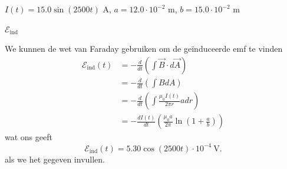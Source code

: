     \begin{description}[labelwidth=1.5cm, leftmargin=!]
        \item[Geg. :] $I(t) = 15.0\sin(2500t)$ A, $a = 12.0 \cdot 10^{-2}$ m, $b = 15.0 \cdot 10^{-2}$ m
        \item[Gevr. :] $\mathcal{E}_{\text{ind}}$
        \item[Opl. :]
            We kunnen de wet van Faraday gebruiken om de geïnduceerde emf te vinden
            \begin{align*}
                \mathcal{E}_{\text{ind}}(t) 
                    &= - \frac{d}{dt} \left( \int \vec{B} \cdot d\vec{A} \right) \\
                    &= - \frac{d}{dt} \left( \int B dA \right) \\
                    &= - \frac{d}{dt} \left( \int \frac{\mu_0 I(t)}{2\pi r}adr \right) \\
                    &= - \frac{dI(t)}{dt} \left( \frac{\mu_0a}{2\pi}\ln\left(1+\frac{a}{b}\right)\right) 
            \end{align*}
            wat ons geeft
            \begin{equation*}
                \mathcal{E}_{\text{ind}}(t) = 5.30 \cos(2500t) \cdot 10^{-4} \ \text{V}.
            \end{equation*}
            als we het gegeven invullen.
    \end{description}

\vspace{1cm}